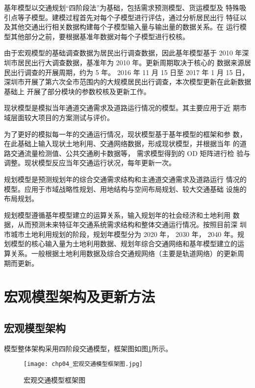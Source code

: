 基年模型以交通规划“四阶段法”为基础，包括需求预测模型、货运模型及
特殊吸引点等子模型。建模过程首先对每个子模型进行评估，通过分析居民出行
特征以及其他交通出行相关数据构建每个子模型输入量与输出量的数据关系。在
运行模型其他部分之前，要根据基准年数据对每个子模型进行校核。

由于宏观模型的基础调查数据为居民出行调查数据，因此基年模型基于
2010 年深圳市居民出行大调查数据，基准年为 2010 年。更新周期取决于核心的
数据来源居民出行调查的开展周期，约为 5 年。 2016 年 11 月 15 日至 2017 年 1
月 15 日，深圳市开展了第六次全市范围内的大规模居民出行调查，本次模型更新在此新数据基础上
开展了部分模块的参数校核及更新工作。

现状模型是模拟当年通道交通需求及道路运行情况的模型。其主要应用于近
期市域层面较大项目的方案测试与评价。

为了更好的模拟每一年的交通运行情况，现状模型基于基年模型的框架和参
数，在此基础上输入现状土地利用、交通网络数据，形成现状模型，并根据当年
的道路交通流量检测值、公共交通刷卡数据等， 需求模型得到的 OD 矩阵进行检
验与调整。现状模型反应当年交通运行状况，每年更新一次。

规划模型是预测规划年的综合交通需求结构和主通道交通需求及道路运行
情况的模型。应用于市域战略性规划、用地结构与空间布局规划、较大交通基础
设施的布局规划。

规划模型遵循基年模型建立的运算关系，输入规划年的社会经济和土地利用
数据，从而预测未来特征年交通系统需求结构和整体交通运行情况。按照目前深
圳市城市土地利用规划的阶段，规划年模型分为 2020 年， 2030 年， 2040 年。规
划模型的核心输入量为土地利用数据、规划年综合交通网络和基年模型建立的运
算关系。一般根据土地利用数据及综合交通规网络（主要是轨道网络）的更新周
期而更新。

\section{宏观模型架构及更新方法}
\subsection{宏观模型架构}
模型整体架构采用四阶段交通模型，框架图如图\ref{fig:chp04_宏观交通模型框架图}所示。

\begin{figure}[!ht]
  \centering
  \texttt{[image: chp04\_宏观交通模型框架图.jpg]}
  \caption{宏观交通模型框架图\label{fig:chp04_宏观交通模型框架图} }
\end{figure}

